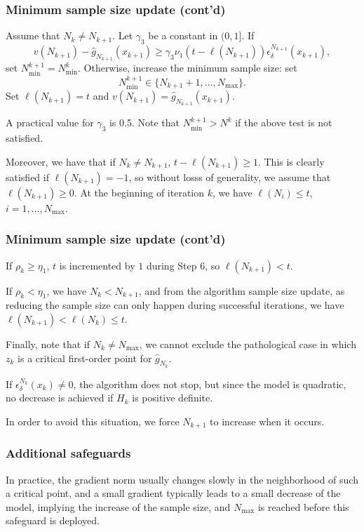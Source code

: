 \documentclass{beamer}
\begin{document}
\begin{frame}
\frametitle{Minimum sample size update (cont'd)}

Assume that $N_k \ne N_{k+1}$.
Let $\gamma_3$ be a constant in $(0,1]$. If
\[
v(N_{k+1}) - \hat{g}_{N_{k+1}}(x_{k+1}) \geq
\gamma_3\nu_1(t-\ell(N_{k+1}))\epsilon_{\delta}^{N_{k+1}}(x_{k+1}),
\]
set $N_{\min}^{k+1} = N_{\min}^k$.
Otherwise, increase the minimum sample size: set
\[
N^{k+1}_{\min} \in \lbrace N_{k+1}+1,\ldots,N_{\max} \rbrace .
\]
Set $\ell(N_{k+1}) = t$ and $v(N_{k+1}) = \hat{g}_{N_{k+1}}(x_{k+1})$.

\mbox{}

A practical value for $\gamma_3$ is 0.5.
Note that $N^{k+1}_{\min} > N^k$ if the above test is not satisfied.

\mbox{}

Moreover, we have that if $N_k \ne N_{k+1}$, $t-\ell(N_{k+1}) \geq 1$.
This is clearly satisfied if $\ell(N_{k+1}) = -1$, so without losss of generality, we assume that $\ell(N_{k+1}) \geq 0$.
At the beginning of iteration $k$, we have $\ell(N_i) \leq t$, $i = 1,\ldots,N_{\max}$.

\end{frame}

\begin{frame}
\frametitle{Minimum sample size update (cont'd)}

If $\rho_k \geq \eta_1$, $t$ is incremented by $1$ during Step 6, so $\ell(N_{k+1}) <
t$.

\mbox{}

If $\rho_k < \eta_1$, we have $N_k < N_{k+1}$, and from the algorithm sample size update, as reducing the sample size can only happen during successful iterations, we have $\ell(N_{k+1}) < \ell(N_k) \leq t$.

\mbox{}

Finally, note that if $N_k \ne N_{\max}$, we cannot exclude the pathological case in which $z_k$ is a critical first-order point for $\hat{g}_{N_k}$.

If $\epsilon_{\delta}^{N_k}(x_k) \ne 0$, the algorithm does not stop, but since the model is quadratic, no decrease is achieved if $H_k$ is positive definite.

In order to avoid this situation, we force  $N_{k+1}$ to increase when it occurs.
\end{frame}

\begin{frame}
\frametitle{Additional safeguards}

\mbox{}

In practice, the gradient norm usually changes slowly in the neighborhood of such a critical point, and a small gradient typically leads to a small decrease of the model, implying the increase of the sample size, and $N_{\max}$ is reached before this safeguard is deployed.

\end{frame}
\end{document}
